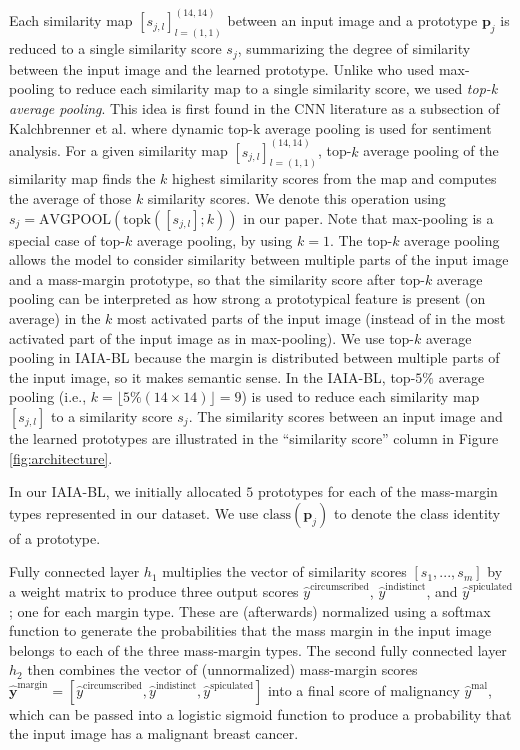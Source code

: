 \documentclass[11pt]{article}
\begin{document}
Each similarity map $[s_{j,l}]_{l=(1,1)}^{(14,14)}$ between an input image and a prototype $\mathbf{p}_j$ is reduced to a single similarity score $s_j$, summarizing the degree of similarity between the input image and the learned prototype. Unlike \cite{PPNet} who used max-pooling to reduce each similarity map to a single similarity score, we used \textit{top-k average pooling}. This idea is first found in the CNN literature as a subsection of Kalchbrenner et al. \citep{kalchbrenner2014convolutional} where dynamic top-k average pooling is used for sentiment analysis. For a given similarity map $[s_{j,l}]_{l=(1,1)}^{(14,14)}$, top-$k$ average pooling of the similarity map finds the $k$ highest similarity scores from the map and computes the average of those $k$ similarity scores. We denote this operation using $s_j = \text{AVGPOOL}({\text{topk}}([s_{j,l}]; k))$ in our paper. Note that max-pooling is a special case of top-$k$ average pooling, by using $k=1$. The top-$k$ average pooling allows the model to consider similarity between multiple parts of the input image and a mass-margin prototype, so that the similarity score after top-$k$ average pooling can be interpreted as how strong a prototypical feature is present (on average) in the $k$ most activated parts of the input image (instead of in the most activated part of the input image as in max-pooling). We use top-$k$ average pooling in IAIA-BL because the margin is distributed between multiple parts of the input image, so it makes semantic sense. In the IAIA-BL, top-$5\%$ average pooling (i.e., $k=\lfloor5\%(14 \times 14)\rfloor=9$) is used to reduce each similarity map $[s_{j,l}]$ to a similarity score $s_j$. The similarity scores between an input image and the learned prototypes are illustrated in the ``similarity score'' column in Figure \ref{fig:architecture}.

In our IAIA-BL, we initially allocated $5$ prototypes for each of the mass-margin types represented in our dataset. We use $\text{class}(\mathbf{p}_j)$ to denote the class identity of a prototype.

Fully connected layer $h_1$ multiplies the vector of similarity scores $[s_1, ..., s_m]$ by a weight matrix to produce three output scores $\hat{y}^{\text{circumscribed}}$, $\hat{y}^{\text{indistinct}}$, and $\hat{y}^{\text{spiculated}}$; one for each margin type. These are (afterwards)  normalized using a softmax function to generate the probabilities that the mass margin in the input image belongs to each of the three mass-margin types. The second fully connected layer $h_2$ then combines the vector of (unnormalized) mass-margin scores $\hat{\mathbf{y}}^{\text{margin}}=[\hat{y}^{\text{circumscribed}}, \hat{y}^{\text{indistinct}}, \hat{y}^{\text{spiculated}}]$ into a final score of malignancy $\hat{y}^{\text{mal}}$, which can be passed into a logistic sigmoid function to produce a probability that the input image has a malignant breast cancer.
\end{document}
